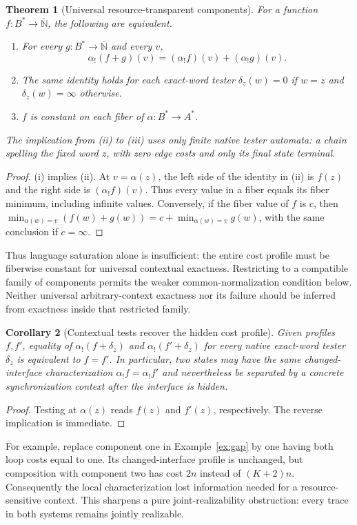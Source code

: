 \documentclass[11pt]{article}
\newtheorem{theorem}{Theorem}[section]
\newtheorem{corollary}[theorem]{Corollary}
\newcommand{\Cost}{\overline{\mathbb N}}
\begin{document}
\begin{theorem}[Universal resource-transparent components]\label{thm:universal}
For a function $f:B^*\to\Cost$, the following are equivalent.
\begin{enumerate}[label=(\roman*)]
\item For every $g:B^*\to\Cost$ and every $v$,
\[
 \alpha_!(f+g)(v)=(\alpha_!f)(v)+(\alpha_!g)(v).
\]
\item The same identity holds for each exact-word tester
$\delta_z(w)=0$ if $w=z$ and $\delta_z(w)=\infty$ otherwise.
\item $f$ is constant on each fiber of $\alpha:B^*\to A^*$.
\end{enumerate}
The implication from (ii) to (iii) uses only finite native tester automata: a chain spelling the fixed word $z$, with zero edge costs and only its final state terminal.
\end{theorem}
\begin{proof}
(i) implies (ii). At $v=\alpha(z)$, the left side of the identity in (ii) is $f(z)$ and the right side is $(\alpha_!f)(v)$. Thus every value in a fiber equals its fiber minimum, including infinite values. Conversely, if the fiber value of $f$ is $c$, then
$\min_{\alpha(w)=v}(f(w)+g(w))=c+\min_{\alpha(w)=v}g(w)$,
with the same conclusion if $c=\infty$.
\end{proof}

Thus language saturation alone is insufficient: the entire cost profile must be fiberwise constant for universal contextual exactness. Restricting to a compatible family of components permits the weaker common-normalization condition below. Neither universal arbitrary-context exactness nor its failure should be inferred from exactness inside that restricted family.

\begin{corollary}[Contextual tests recover the hidden cost profile]\label{cor:context}
Given profiles $f,f'$, equality of
$\alpha_!(f+\delta_z)$ and $\alpha_!(f'+\delta_z)$ for every native exact-word tester $\delta_z$ is equivalent to $f=f'$. In particular, two states may have the same changed-interface characterization $\alpha_!f=\alpha_!f'$ and nevertheless be separated by a concrete synchronization context after the interface is hidden.
\end{corollary}
\begin{proof}
Testing at $\alpha(z)$ reads $f(z)$ and $f'(z)$, respectively. The reverse implication is immediate.
\end{proof}
For example, replace component one in Example~\ref{ex:gap} by one having both loop costs equal to one. Its changed-interface profile is unchanged, but composition with component two has cost $2n$ instead of $(K+2)n$. Consequently the local characterization lost information needed for a resource-sensitive context. This sharpens a pure joint-realizability obstruction: every trace in both systems remains jointly realizable.
\end{document}

